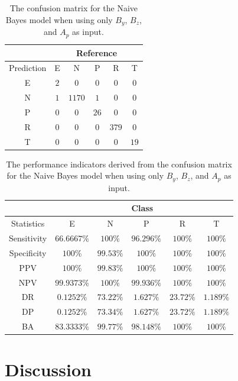 \documentclass[sn-mathphys-num]{sn-jnl}%
\begin{document}
\begin{table}[!ht]
    \centering
    \caption{The confusion matrix for the Naive Bayes model when using only $B_{y}$, $B_{z}$, and $A_{p}$ as input.}
	\label{tab:cm:yzap:nb}
	\begin{tabular}{|c|c|c|c|c|c|}
		\hline
		 & \multicolumn{5}{|c|}{Reference} \\ \hline
		 Prediction & E & N & P & R & T \\ \hline
		 E & $2$ & $0$ & $0$ & $0$ & $0$ \\ \hline
		 N & $1$ & $1170$ & $1$ & $0$ & $0$ \\ \hline
		 P & $0$ & $0$ & $26$ & $0$ & $0$ \\ \hline
		 R & $0$ & $0$ & $0$ & $379$ & $0$ \\ \hline
		 T & $0$ & $0$ & $0$ & $0$ & $19$ \\ \hline
	\end{tabular}
\end{table}

\begin{table}[!ht]
    \centering
    \caption{The performance indicators derived from the confusion matrix for the Naive Bayes model when using only $B_{y}$, $B_{z}$, and $A_{p}$ as input.}
	\label{tab:cs:reverse:yzap:nb}
	\begin{tabular}{|c|c|c|c|c|c|}
		\hline
		 & \multicolumn{5}{c|}{Class} \\ \hline
		Statistics & E & N & P & R & T \\ \hline
		Sensitivity & $66.6667\%$ & $100\%$ & $96.296\%$ & $100\%$ & $100\%$ \\ \hline
		Specificity & $100\%$ & $99.53\%$ & $100\%$ & $100\%$ & $100\%$ \\ \hline
		PPV & $100\%$ & $99.83\%$ & $100\%$ & $100\%$ & $100\%$ \\ \hline
		NPV & $99.9373\%$ & $100\%$ & $99.936\%$ & $100\%$ & $100\%$ \\ \hline
		DR & $0.1252\%$ & $73.22\%$ & $1.627\%$ & $23.72\%$ & $1.189\%$ \\ \hline
		DP & $0.1252\%$ & $73.34\%$ & $1.627\%$ & $23.72\%$ & $1.189\%$ \\ \hline
		BA & $83.3333\%$ & $99.77\%$ & $98.148\%$ & $100\%$ & $100\%$ \\ \hline
	\end{tabular}
\end{table}

\section{Discussion}
\label{sec:Discussion}
\end{document}
